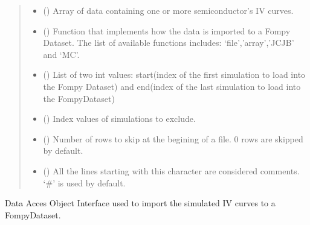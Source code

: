 \documentclass[letterpaper,10pt,english,openany, oneside]{sphinxmanual}
\begin{document}
\begin{fulllineitems}
\begin{fulllineitems}
\begin{quote}
\begin{description}
\begin{itemize}
\item {} 
 () \textendash{} Array of data containing one or more semiconductor’s IV curves.

\item {} 
 () \textendash{} Function that implements how the data is imported to a Fompy Dataset. The list of available functions includes:
‘file’,’array’,’JCJB’ and ‘MC’.

\item {} 
 () \textendash{} List of two int values: start(index of the first simulation to load into the Fompy Dataset)
and end(index of the last simulation to load into the FompyDataset)

\item {} 
 () \textendash{} Index values of simulations to exclude.

\item {} 
 () \textendash{} Number of rows to skip at the begining of a file. 0 rows are skipped by default.

\item {} 
 () \textendash{} All the lines starting with this character are considered comments.
‘\#’ is used by default.

\end{itemize}

\end{description}\end{quote}

\end{fulllineitems}


\end{fulllineitems}


\begin{fulllineitems}
\label{\detokenize{index:fompy.fds.dataDAO}}
Data Acces Object Interface used to import the simulated IV curves to a FompyDataset.

\end{fulllineitems}
\end{document}
